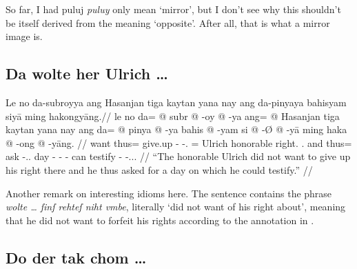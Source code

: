 \documentclass[12pt,paper=a4]{scrartcl}
\newcommand{\fw}[1]{\textit{#1}} %
\newcommand{\ayr}[1]{{\Tagati #1}}
\begin{document}
So far, I had \ayr{puluj} \fw{puluy} only mean `mirror', but I don't see why 
this shouldn't be itself derived from the meaning `opposite'. After all, that is 
what a mirror image is.

\subsection*{Da wolte her Ulrich …}


\ex \begingl
	\glpreamble Le no da-subroyya ang Hasanjan tiga kaytan yana nay 
		ang da-pinyaya bahisyam siyā ming ha\-kong\-yāng.//
	\gla le no da= @ subr @ -oy @ -ya ang= @ Hasanjan tiga kaytan yana 
		nay ang da= @ pinya @ -ya bahis @ -yam si @ -Ø @ -yā ming haka 
		@ -ong @ -yāng. //
	\glb \PatT{} want thus= give.up -\Neg{} -\Tsg{}.\M{} \Aarg{}= Ulrich 
		honorable right.\Top{} \Tsg{}.\Gen{} and \AgtT{} thus= ask 
		-\Tsg{}.\M{}.\Top{} day -\Dat{} \Rel{} -\Dat{} -\Loc{} can 
		testify -\Irr{} -\Tsg{}.\M{}.\Aarg{}. //
	\glft \enquote{The honorable Ulrich did not want to give up his right 
		there and he thus asked for a day on which he could testify.} //
\endgl \xe

Another remark on interesting idioms here. The \Mhg{} sentence contains the 
phrase \fw{wolte … ſinſ rehteſ niht vmbe}, literally `did not want of his 
right about', meaning that he did not want to forfeit his rights according to 
the annotation in \textcite{n163-online}.

\subsection*{Do der tak chom …}

\end{document}
